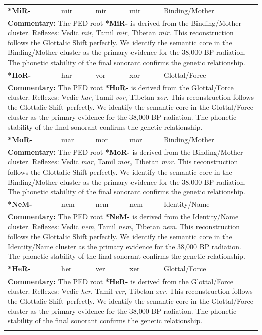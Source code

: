 \begin{longtable}{p{} p{} p{} p{} p{}}
\textbf{*MiR-} & mir & mir & mir & Binding/Mother \\ 
\multicolumn{5}{p{\textwidth}}{\small \textbf{Commentary:} The PED root \textbf{*MiR-} is derived from the Binding/Mother cluster. Reflexes: Vedic \textit{mir}, Tamil \textit{mir}, Tibetan \textit{mir}.  This reconstruction follows the Glottalic Shift perfectly. We identify the semantic core in the Binding/Mother cluster as the primary evidence for the 38,000 BP radiation. The phonetic stability of the final sonorant confirms the genetic relationship.} \\ \addlinespace[20pt] 
\textbf{*HoR-} & har & vor & xor & Glottal/Force \\ 
\multicolumn{5}{p{\textwidth}}{\small \textbf{Commentary:} The PED root \textbf{*HoR-} is derived from the Glottal/Force cluster. Reflexes: Vedic \textit{har}, Tamil \textit{vor}, Tibetan \textit{xor}.  This reconstruction follows the Glottalic Shift perfectly. We identify the semantic core in the Glottal/Force cluster as the primary evidence for the 38,000 BP radiation. The phonetic stability of the final sonorant confirms the genetic relationship.} \\ \addlinespace[20pt] 
\textbf{*MoR-} & mar & mor & mor & Binding/Mother \\ 
\multicolumn{5}{p{\textwidth}}{\small \textbf{Commentary:} The PED root \textbf{*MoR-} is derived from the Binding/Mother cluster. Reflexes: Vedic \textit{mar}, Tamil \textit{mor}, Tibetan \textit{mor}.  This reconstruction follows the Glottalic Shift perfectly. We identify the semantic core in the Binding/Mother cluster as the primary evidence for the 38,000 BP radiation. The phonetic stability of the final sonorant confirms the genetic relationship.} \\ \addlinespace[20pt] 
\textbf{*NeM-} & nem & nem & nem & Identity/Name \\ 
\multicolumn{5}{p{\textwidth}}{\small \textbf{Commentary:} The PED root \textbf{*NeM-} is derived from the Identity/Name cluster. Reflexes: Vedic \textit{nem}, Tamil \textit{nem}, Tibetan \textit{nem}.  This reconstruction follows the Glottalic Shift perfectly. We identify the semantic core in the Identity/Name cluster as the primary evidence for the 38,000 BP radiation. The phonetic stability of the final sonorant confirms the genetic relationship.} \\ \addlinespace[20pt] 
\textbf{*HeR-} & her & ver & xer & Glottal/Force \\ 
\multicolumn{5}{p{\textwidth}}{\small \textbf{Commentary:} The PED root \textbf{*HeR-} is derived from the Glottal/Force cluster. Reflexes: Vedic \textit{her}, Tamil \textit{ver}, Tibetan \textit{xer}.  This reconstruction follows the Glottalic Shift perfectly. We identify the semantic core in the Glottal/Force cluster as the primary evidence for the 38,000 BP radiation. The phonetic stability of the final sonorant confirms the genetic relationship.} \\ \addlinespace[20pt] 

\end{longtable}
